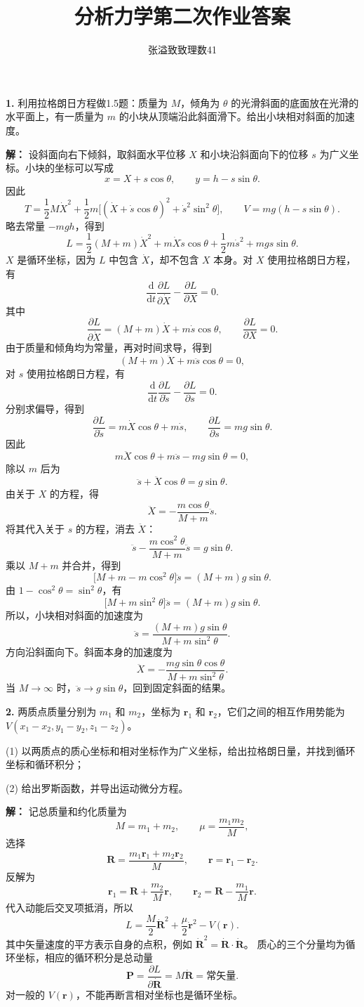 \documentclass[11pt,a4paper]{ctexart}
\title{分析力学第二次作业答案}
\author{张溢致\quad 致理数41\quad 2024011936}
\date{}
\begin{document}
\maketitle
\noindent\textbf{1.} 利用拉格朗日方程做1.5题：质量为 $M$，倾角为 $\theta$ 的光滑斜面的底面放在光滑的水平面上，有一质量为 $m$ 的小块从顶端沿此斜面滑下。给出小块相对斜面的加速度。

\textbf{解：} 设斜面向右下倾斜，取斜面水平位移 $X$ 和小块沿斜面向下的位移 $s$ 为广义坐标。小块的坐标可以写成
\[
x=X+s\cos\theta,\qquad y=h-s\sin\theta.
\]
因此
\[
T=\frac12M\dot X^2+\frac12m\bigl[(\dot X+\dot s\cos\theta)^2+\dot s^2\sin^2\theta\bigr],
\qquad V=mg(h-s\sin\theta).
\]
略去常量 $-mgh$，得到
\[
L=\frac12(M+m)\dot X^2+m\dot X\dot s\cos\theta+\frac12m\dot s^2+mgs\sin\theta.
\]
$X$ 是循环坐标，因为 $L$ 中包含 $\dot X$，却不包含 $X$ 本身。对 $X$ 使用拉格朗日方程，有
\[
\frac{\mathrm d}{\mathrm dt}\frac{\partial L}{\partial\dot X}
-\frac{\partial L}{\partial X}=0.
\]
其中
\[
\frac{\partial L}{\partial\dot X}=(M+m)\dot X+m\dot s\cos\theta,
\qquad\frac{\partial L}{\partial X}=0.
\]
由于质量和倾角均为常量，再对时间求导，得到
\[
(M+m)\ddot X+m\ddot s\cos\theta=0,
\]
对 $s$ 使用拉格朗日方程，有
\[
\frac{\mathrm d}{\mathrm dt}\frac{\partial L}{\partial\dot s}
-\frac{\partial L}{\partial s}=0.
\]
分别求偏导，得到
\[
\frac{\partial L}{\partial\dot s}=m\dot X\cos\theta+m\dot s,
\qquad\frac{\partial L}{\partial s}=mg\sin\theta.
\]
因此
\[
m\ddot X\cos\theta+m\ddot s-mg\sin\theta=0,
\]
除以 $m$ 后为
\[
\ddot s+\ddot X\cos\theta=g\sin\theta.
\]
由关于 $X$ 的方程，得
\[
\ddot X=-\frac{m\cos\theta}{M+m}\ddot s.
\]
将其代入关于 $s$ 的方程，消去 $\ddot X$：
\[
\ddot s-\frac{m\cos^2\theta}{M+m}\ddot s=g\sin\theta.
\]
乘以 $M+m$ 并合并，得到
\[
\bigl[M+m-m\cos^2\theta\bigr]\ddot s
=(M+m)g\sin\theta.
\]
由 $1-\cos^2\theta=\sin^2\theta$，有
\[
\bigl[M+m\sin^2\theta\bigr]\ddot s=(M+m)g\sin\theta.
\]
所以，小块相对斜面的加速度为
\[
\ddot s=\frac{(M+m)g\sin\theta}{M+m\sin^2\theta}.
\]
方向沿斜面向下。斜面本身的加速度为
\[
\ddot X=-\frac{mg\sin\theta\cos\theta}{M+m\sin^2\theta}.
\]
当 $M\to\infty$ 时，$\ddot s\to g\sin\theta$，回到固定斜面的结果。

\noindent\textbf{2.} 两质点质量分别为 $m_1$ 和 $m_2$，坐标为 $\bm r_1$ 和 $\bm r_2$，它们之间的相互作用势能为 $V(x_1-x_2,y_1-y_2,z_1-z_2)$。

(1) 以两质点的质心坐标和相对坐标作为广义坐标，给出拉格朗日量，并找到循环坐标和循环积分；

(2) 给出罗斯函数，并导出运动微分方程。

\textbf{解：} 记总质量和约化质量为
\[
M=m_1+m_2,\qquad \mu=\frac{m_1m_2}{M},
\]
选择
\[
\bm R=\frac{m_1\bm r_1+m_2\bm r_2}{M},\qquad \bm r=\bm r_1-\bm r_2.
\]
反解为
\[
\bm r_1=\bm R+\frac{m_2}{M}\bm r,\qquad
\bm r_2=\bm R-\frac{m_1}{M}\bm r.
\]
代入动能后交叉项抵消，所以
\[
L=\frac M2\dot{\bm R}^{2}+\frac\mu2\dot{\bm r}^{2}-V(\bm r).
\]
其中矢量速度的平方表示自身的点积，例如 $\dot{\bm R}^{2}=\dot{\bm R}\cdot\dot{\bm R}$。
质心的三个分量均为循环坐标，相应的循环积分是总动量
\[
{\bm P=\frac{\partial L}{\partial\dot{\bm R}}=M\dot{\bm R}=\text{常矢量}}.
\]
对一般的 $V(\bm r)$，不能再断言相对坐标也是循环坐标。
\end{document}
